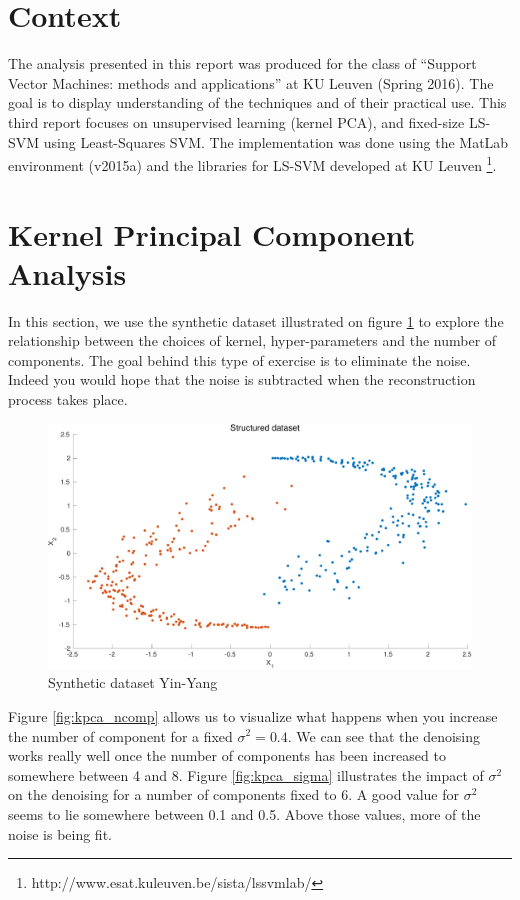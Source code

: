 \documentclass[11pt, a4paper]{article}
\begin{document}

\tableofcontents
\newpage

\section*{Context}

The analysis presented in this report was produced for the class of
``Support Vector Machines: methods and applications'' at KU Leuven
(Spring 2016). The goal is to display understanding of the techniques
and of their practical use. This third report focuses on unsupervised
learning (kernel PCA), and fixed-size LS-SVM using Least-Squares
SVM. The implementation was done using the MatLab environment (v2015a)
and the libraries for LS-SVM developed at KU Leuven
\footnote{http://www.esat.kuleuven.be/sista/lssvmlab/}.

\section{Kernel Principal Component Analysis}

In this section, we use the synthetic dataset illustrated on figure
\ref{fig:kpca_dataset} to explore the relationship between the choices
of kernel, hyper-parameters and the number of components. The goal
behind this type of exercise is to eliminate the noise. Indeed you
would hope that the noise is subtracted when the reconstruction
process takes place.

\begin{figure}[H]
  \centering
  \includegraphics[scale=.35]{kpca_dataset.pdf}
  \caption{Synthetic dataset Yin-Yang}
  \label{fig:kpca_dataset}
\end{figure}

Figure \ref{fig:kpca_ncomp} allows us to visualize what happens when
you increase the number of component for a fixed $\sigma^2=0.4$. We
can see that the denoising works really well once the number of
components has been increased to somewhere between 4 and 8. Figure
\ref{fig:kpca_sigma} illustrates the impact of $\sigma^2$ on the
denoising for a number of components fixed to 6. A good value for
$\sigma^2$ seems to lie somewhere between 0.1 and 0.5. Above those
values, more of the noise is being fit.
\end{document}
